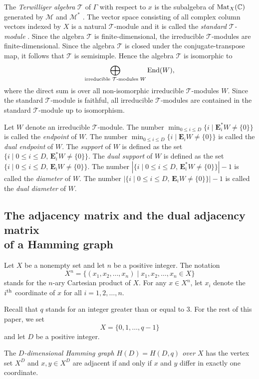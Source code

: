 \documentclass[10pt,a4paper]{amsart}
\def\E{\mathbf E}
\def\C{\mathbb C}
\def\End{{\rm End}}
\def\Mat{{\rm Mat}}
\def\M{\mathcal M}
\def\T{\mathcal T}
\numberwithin{equation}{section}
\begin{document}
The {\it Terwilliger algebra} $\T$ of $\Gamma$ with respect to $x$ is the subalgebra of $\Mat_X(\C)$ generated by $\M$ and $\M^*$ \cite[Definition 3.3]{TerAlgebraI}.
The vector space consisting of all complex column vectors indexed by $X$ is a natural $\T$-module and it is called the {\it standard $\T$-module} \cite[p.~368]{TerAlgebraI}.
Since the algebra $\T$ is finite-dimensional, the irreducible $\T$-modules are finite-dimensional. Since the algebra $\T$ is closed under the conjugate-transpose map, it follows that $\T$ is semisimple.
Hence the algebra $\T$ is isomorphic to
\[
\bigoplus_{\text{irreducible $\T$-modules $W$}} \End(W),
\]
where the direct sum is over all non-isomorphic irreducible $\T$-modules $W$.
Since the standard $\T$-module is faithful, all irreducible $\T$-modules are contained in the standard $\T$-module up to isomorphism.

Let $W$ denote an irreducible $\T$-module.
The number $\min_{0\leq i\leq D}\{i\mid \E_i^* W\not=\{0\}\}$ is called the {\it endpoint} of $W$.
The number
$\min_{0\leq i\leq D}\{i\mid \E_i W\not=\{0\}\}$ is called the {\it dual endpoint} of $W$.
The {\it support} of $W$ is defined as the set $\{i\mid 0\leq i\leq D,\, \E_i^* W\not=\{0\}\}$. The {\it dual support} of $W$ is defined as the set $\{i\mid 0\leq i\leq D,\, \E_i W\not=\{0\}\}$.
The number
$|\{i\mid 0\leq i\leq D,\, \E_i^* W\not=\{0\}\}|-1$
is called the {\it diameter} of $W$. The number
$|\{i\mid 0\leq i\leq D,\, \E_i W\not=\{0\}\}|-1$
is called the {\it dual diameter} of $W$.


\subsection[The adjacency matrix and the dual adjacency matrix of a Hamming grap]{The adjacency matrix and the dual adjacency matrix \\of a Hamming graph}
\label{s:A&A*_Hamming}

Let $X$ be a nonempty set and let $n$ be a positive integer.
The notation
\[
X^n=\{(x_1,x_2,\dots,x_n)\mid x_1,x_2,\dots,x_n\in X\}
\]
stands for the $n$-ary Cartesian product of $X$.
For any $x\in X^n$, let $x_i$ denote the $i^{\rm th}$ coordinate of $x$ for all $i=1,2,\dots,n$.

Recall that $q$ stands for an integer greater than or equal to $3$. For the rest of this paper, we set
\[
X=\{0,1,\dots,q-1\}
\]
and let $D$ be a positive integer.

\begin{Definition}%
The {\it $D$-dimensional Hamming graph $H(D)=H(D,q)$ over $X$} has the vertex set $X^D$ and $x,y\in X^D$ are adjacent if and only if $x$ and $y$ differ in exactly one coordinate.
\end{Definition}
\end{document}
